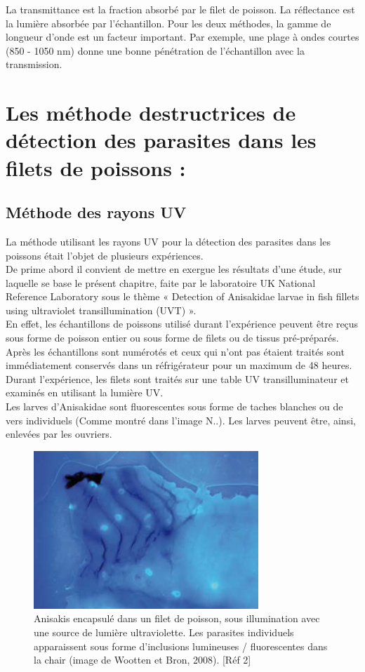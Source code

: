 \documentclass[12pt,a4paper]{article}
\begin{document}
La transmittance est la fraction absorbé par le filet de poisson. La réflectance est la lumière absorbée par l'échantillon.
Pour les deux méthodes, la gamme de longueur d'onde est un facteur important. Par exemple, une plage à ondes courtes (850 - 1050 nm) donne une bonne pénétration de l'échantillon avec la transmission.


\newpage
\section {Les  méthode destructrices de détection des parasites dans les filets de poissons :}
\subsection{Méthode des rayons UV}
La méthode utilisant les rayons UV pour la détection des parasites dans les poissons était l’objet de plusieurs expériences.\\
De prime abord il convient de mettre en exergue les résultats d’une étude, sur laquelle se base le présent chapitre, faite par le laboratoire UK National Reference Laboratory sous le thème « Detection of Anisakidae larvae in fish fillets using ultraviolet transillumination (UVT) ». \\
En effet, les échantillons de poissons utilisé durant l’expérience peuvent être reçus sous forme de poisson entier ou sous forme de filets ou de tissus pré-préparés. Après les échantillons sont numérotés et ceux qui n’ont pas étaient traités sont immédiatement conservés dans un réfrigérateur pour un maximum de 48 heures. Durant l’expérience,  les filets sont traités sur une  table UV transilluminateur et examinés en utilisant la lumière UV.\\
Les larves d'Anisakidae sont fluorescentes sous forme de taches blanches ou de vers individuels (Comme montré dans l'image N..). Les larves peuvent être, ainsi, enlevées par les ouvriers.
\begin{figure}[!h]
   \center
   \includegraphics[scale=0.5]{UV.png}
   \caption {Anisakis encapsulé dans un filet de poisson, sous illumination avec une source de lumière ultraviolette. Les parasites individuels apparaissent sous forme d'inclusions lumineuses / fluorescentes dans la chair (image de Wootten et Bron, 2008). [Réf 2]}
\end{figure}
\end{document}

